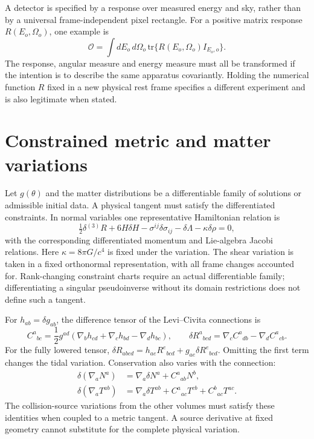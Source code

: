 A detector is specified by a response over measured energy and sky, rather than by a universal frame-independent pixel rectangle. For a positive matrix response $R(E_o,\Omega_o)$, one example is
\begin{equation}\label{vii:detector}
\mathcal O=\int dE_o\,d\Omega_o\,
\mathrm{tr}\{R(E_o,\Omega_o)I_{E_o,o}\}.
\end{equation}
The response, angular measure and energy measure must all be transformed if the intention is to describe the same apparatus covariantly. Holding the numerical function $R$ fixed in a new physical rest frame specifies a different experiment and is also legitimate when stated.

\section{Constrained metric and matter variations}
Let $g(\theta)$ and the matter distributions be a differentiable family of solutions or admissible initial data. A physical tangent must satisfy the differentiated constraints. In normal variables one representative Hamiltonian relation is
\begin{equation}\label{vii:constraint_tangent}
\tfrac12\delta{}^{(3)}R+6H\delta H-\sigma^{ij}\delta\sigma_{ij}
-\delta\Lambda-\kappa\delta\rho=0,
\end{equation}
with the corresponding differentiated momentum and Lie-algebra Jacobi relations. Here $\kappa=8\pi G/c^4$ is fixed under the variation. The shear variation is taken in a fixed orthonormal representation, with all frame changes accounted for. Rank-changing constraint charts require an actual differentiable family; differentiating a singular pseudoinverse without its domain restrictions does not define such a tangent.

For $h_{ab}=\delta g_{ab}$, the difference tensor of the Levi--Civita connections is
\begin{equation}\label{vii:connection_variation}
C^a{}_{bc}=\frac12g^{ad}(\nabla_bh_{cd}+\nabla_ch_{bd}-\nabla_dh_{bc}),\qquad
\delta R^a{}_{bcd}=\nabla_cC^a{}_{db}-\nabla_dC^a{}_{cb}.
\end{equation}
For the fully lowered tensor, $\delta R_{abcd}=h_{ae}R^e{}_{bcd}+g_{ae}\delta R^e{}_{bcd}$. Omitting the first term changes the tidal variation. Conservation also varies with the connection:
\begin{align}
\delta(\nabla_aN^a)&=\nabla_a\delta N^a+C^a{}_{ab}N^b,\label{vii:current_variation}\\
\delta(\nabla_aT^{ab})&=\nabla_a\delta T^{ab}+C^a{}_{ac}T^{cb}+C^b{}_{ac}T^{ac}.\label{vii:stress_variation}
\end{align}
The collision-source variations from the other volumes must satisfy these identities when coupled to a metric tangent. A source derivative at fixed geometry cannot substitute for the complete physical variation.

